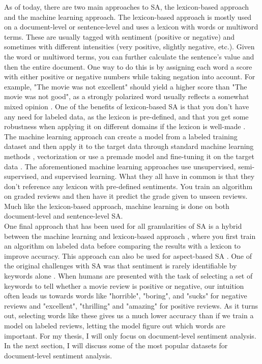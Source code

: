 As of today, there are two main approaches to SA, the lexicon-based approach and the machine learning approach. The lexicon-based approach is mostly used on a document-level or sentence-level and uses a lexicon with words or multiword terms. These are usually tagged with sentiment (positive or negative) and sometimes with different intensities (very positive, slightly negative, etc.). Given the word or multiword terms, you can further calculate the sentence's value and then the entire document. One way to do this is by assigning each word a score with either positive or negative numbers while taking negation into account. For example, "The movie was not excellent" should yield a higher score than "The movie was not good", as a strongly polarized word usually reflects a somewhat mixed opinion \cite{taboada-etal-2011-lexicon}. One of the benefits of lexicon-based SA is that you don't have any need for labeled data, as the lexicon is pre-defined, and that you get some robustness when applying it on different domains if the lexicon is well-made \cite{taboada-etal-2011-lexicon}.\\
The machine learning approach can create a model from a labeled training dataset and then apply it to the target data through standard machine learning methods \cite{pang-etal-2002-thumbs}, vectorization \cite{Peters:2018, mikolov2013efficient, pennington2014glove} or use a premade model and fine-tuning it on the target data \cite{DBLP:journals/corr/abs-1810-04805}. The aforementioned machine learning approaches use unsupervised, semi-supervised, and supervised learning. What they all have in common is that they don't reference any lexicon with pre-defined sentiments. You train an algorithm on graded reviews and then have it predict the grade given to unseen reviews. Much like the lexicon-based approach, machine learning is done on both document-level and sentence-level SA.\\
One final approach that has been used for all granularities of SA is a hybrid between the machine learning and lexicon-based approach \cite{zhang2011combining}, where you first train an algorithm on labeled data before comparing the results with a lexicon to improve accuracy. This approach can also be used for aspect-based SA \cite{brun2016xrce}.
One of the original challenges with SA was that sentiment is rarely identifiable by keywords alone \cite{pang-etal-2002-thumbs}. When humans are presented with the task of selecting a set of keywords to tell whether a movie review is positive or negative, our intuition often leads us towards words like "horrible", "boring", and "sucks" for negative reviews and "excellent", "thrilling" and "amazing" for positive reviews. As it turns out, selecting words like these gives us a much lower accuracy than if we train a model on labeled reviews, letting the model figure out which words are important. For my thesis, I will only focus on document-level sentiment analysis. In the next section, I will discuss some of the most popular datasets for document-level sentiment analysis.

